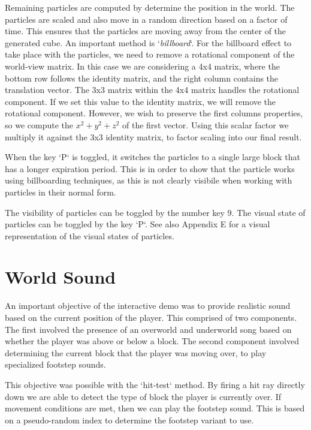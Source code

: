 \documentclass{book}
\begin{document}
Remaining particles are computed by determine the position in the world.  The particles are scaled and also move in a random direction based on a factor of time.  This ensures that the particles are moving away from the center of the generated cube.  An important method is `\textit{billboard}`.  For the billboard effect to take place with the particles, we need to remove a rotational component of the world-view matrix.  In this case we are considering a 4x4 matrix, where the bottom row follows the identity matrix, and the right column contains the translation vector.  The 3x3 matrix within the 4x4 matrix handles the rotational component.  If we set this value to the identity matrix, we will remove the rotational component.  However, we wish to preserve the first columns properties, so we compute the $x^2 + y^2 + z^2$ of the first vector.  Using this scalar factor we multiply it against the 3x3 identity matrix, to factor scaling into our final result.
    
When the key `P` is toggled, it switches the particles to a single large block that has a longer expiration period.  This is in order to show that the particle works using billboarding techniques, as this is not clearly visibile when working with particles in their normal form.
    
The visibility of particles can be toggled by the number key 9.  The visual state of particles can be toggled by the key `P`.  See also Appendix E for a visual representation of the visual states of particles.
    
\section{World Sound}
    
An important objective of the interactive demo was to provide realistic sound based on the current position of the player.  This comprised of two components.  The first involved the presence of an overworld and underworld song based on whether the player was above or below a block.   The second component involved determining the current block that the player was moving over, to play specialized footstep sounds.
    
This objective was possible with the `hit-test` method.  By firing a hit ray directly down we are able to detect the type of block the player is currently over.  If movement conditions are met, then we can play the footstep sound.  This is based on a pseudo-random index to determine the footstep variant to use.
    
\end{document}
